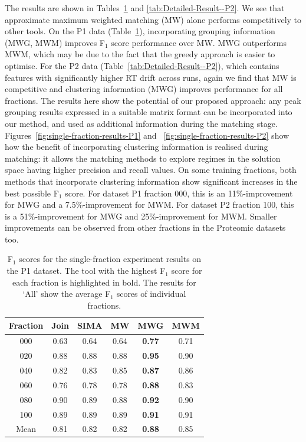 The results are shown in Tables~\ref{tab:Detailed-Result--P1} and \ref{tab:Detailed-Result--P2}. We see that approximate maximum weighted matching (MW) alone performs competitively to other tools. On the P1 data (Table~\ref{tab:Detailed-Result--P1}), incorporating grouping information (MWG, MWM) improves F$_{1}$ score performance over MW. MWG outperforms MWM, which may be due to the fact that the greedy approach is easier to optimise. For the P2 data (Table~\ref{tab:Detailed-Result--P2}), which contains features with significantly higher RT drift across runs, again we find that MW is competitive and clustering information (MWG) improves performance for all fractions. The results here show the potential of our proposed approach: any peak grouping results expressed in a suitable matrix format can be incorporated into our method, and used as additional information during the matching stage. Figures~\ref{fig:single-fraction-results-P1} and ~\ref{fig:single-fraction-results-P2} show how the benefit of incorporating clustering information is realised during matching: it allows the matching methods to explore regimes in the solution space having higher precision and recall values. On some training fractions, both methods that incorporate clustering information show significant increases in the best possible F$_1$ score. For dataset P1 fraction 000, this is an 11\%-improvement for MWG and a 7.5\%-improvement for MWM. For dataset P2 fraction 100, this is a 51\%-improvement for MWG and 25\%-improvement for MWM. Smaller improvements can be observed from other fractions in the Proteomic datasets too.

\begin{table}[!htbp]
\begin{centering}
\begin{tabular}{|c|c|c|c|c|c|}
\hline 
{Fraction} & {Join} & {SIMA} & {MW} & {MWG} & {MWM}\tabularnewline
\hline 
\hline 
{000} & {0.63} & {0.64} & {0.64} & \textbf{0.77} & {0.71}\tabularnewline
\hline 
{020} & {0.88} & {0.88} & {0.88} & \textbf{0.95} & {0.90}\tabularnewline
\hline 
{040} & {0.82} & {0.83} & {0.85} & \textbf{0.87} & {0.86}\tabularnewline
\hline 
{060} & {0.76} & {0.78} & {0.78} & \textbf{0.88} & {0.83}\tabularnewline
\hline 
{080} & {0.90} & {0.89} & {0.88} & \textbf{0.92} & {0.90}\tabularnewline
\hline 
{100} & {0.89} & {0.89} & {0.89} & \textbf{0.91} & {0.91}\tabularnewline
\hline 
{Mean} & {0.81} & {0.82} & {0.82} & \textbf{0.88} & {0.85}\tabularnewline
\hline 
\end{tabular}
\par\end{centering}
\caption{\label{tab:Detailed-Result--P1}F$_1$ scores for the single-fraction experiment results on the P1 dataset. The tool with the highest F$_1$ score for each fraction is highlighted in bold. The results for `All' show the average F$_1$ scores of individual fractions.}
\end{table}

